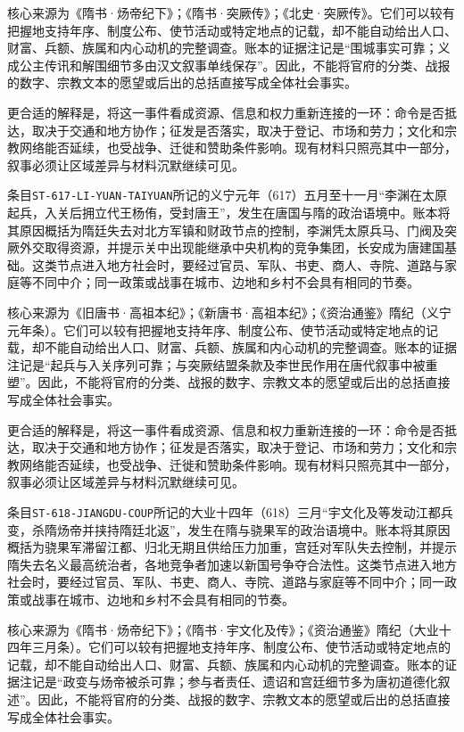 核心来源为《隋书·炀帝纪下》；《隋书·突厥传》；《北史·突厥传》。它们可以较有把握地支持年序、制度公布、使节活动或特定地点的记载，却不能自动给出人口、财富、兵额、族属和内心动机的完整调查。账本的证据注记是“围城事实可靠；义成公主传讯和解围细节多由汉文叙事单线保存”。因此，不能将官府的分类、战报的数字、宗教文本的愿望或后出的总括直接写成全体社会事实。

更合适的解释是，将这一事件看成资源、信息和权力重新连接的一环：命令是否抵达，取决于交通和地方协作；征发是否落实，取决于登记、市场和劳力；文化和宗教网络能否延续，也受战争、迁徙和赞助条件影响。现有材料只照亮其中一部分，叙事必须让区域差异与材料沉默继续可见。

条目\texttt{ST-617-LI-YUAN-TAIYUAN}所记的义宁元年（617）五月至十一月“李渊在太原起兵，入关后拥立代王杨侑，受封唐王”，发生在唐国与隋的政治语境中。账本将其原因概括为隋廷失去对北方军镇和财政节点的控制，李渊凭太原兵马、门阀及突厥外交取得资源，并提示关中出现能继承中央机构的竞争集团，长安成为唐建国基础。这类节点进入地方社会时，要经过官员、军队、书吏、商人、寺院、道路与家庭等不同中介；同一政策或战事在城市、边地和乡村不会具有相同的节奏。

核心来源为《旧唐书·高祖本纪》；《新唐书·高祖本纪》；《资治通鉴》隋纪（义宁元年条）。它们可以较有把握地支持年序、制度公布、使节活动或特定地点的记载，却不能自动给出人口、财富、兵额、族属和内心动机的完整调查。账本的证据注记是“起兵与入关序列可靠；与突厥结盟条款及李世民作用在唐代叙事中被重塑”。因此，不能将官府的分类、战报的数字、宗教文本的愿望或后出的总括直接写成全体社会事实。

更合适的解释是，将这一事件看成资源、信息和权力重新连接的一环：命令是否抵达，取决于交通和地方协作；征发是否落实，取决于登记、市场和劳力；文化和宗教网络能否延续，也受战争、迁徙和赞助条件影响。现有材料只照亮其中一部分，叙事必须让区域差异与材料沉默继续可见。

条目\texttt{ST-618-JIANGDU-COUP}所记的大业十四年（618）三月“宇文化及等发动江都兵变，杀隋炀帝并挟持隋廷北返”，发生在隋与骁果军的政治语境中。账本将其原因概括为骁果军滞留江都、归北无期且供给压力加重，宫廷对军队失去控制，并提示隋失去名义最高统治者，各地竞争者加速以新国号争夺合法性。这类节点进入地方社会时，要经过官员、军队、书吏、商人、寺院、道路与家庭等不同中介；同一政策或战事在城市、边地和乡村不会具有相同的节奏。

核心来源为《隋书·炀帝纪下》；《隋书·宇文化及传》；《资治通鉴》隋纪（大业十四年三月条）。它们可以较有把握地支持年序、制度公布、使节活动或特定地点的记载，却不能自动给出人口、财富、兵额、族属和内心动机的完整调查。账本的证据注记是“政变与炀帝被杀可靠；参与者责任、遗诏和宫廷细节多为唐初道德化叙述”。因此，不能将官府的分类、战报的数字、宗教文本的愿望或后出的总括直接写成全体社会事实。


